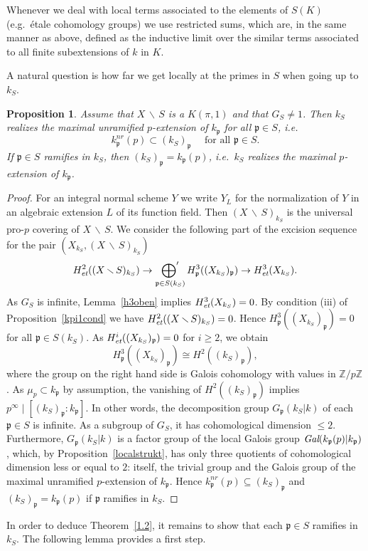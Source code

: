 \documentclass[10pt]{article}
\newcommand{\Z}{{\mathbb Z}}
\newcommand{\p}{{\mathfrak p}}
\newcommand{\sm}{{\,\smallsetminus\,}}
\newcommand{\et}{\text{\it et}}
\newcommand{\Gal}{\text{\it Gal}}
\newcommand{\ressum}{\mathop{\hbox{${\displaystyle\bigoplus}'$}}\limits}
\theoremstyle{alex}
\newtheorem{proposition}[theorem]{Proposition}
\theoremstyle{alexdef}
\begin{document}
\medskip
Whenever we deal with local terms associated to the elements of $S(K)$ (e.g.\ \'{e}tale cohomology groups) we use restricted sums, which are, in the same manner as above, defined as the inductive limit over the similar terms associated to all finite subextensions of $k$ in $K$.


\bigskip
A natural question is how far we get locally at the primes in $S$ when going up to~$k_S$.
\begin{proposition} \label{wieweitlokal}
Assume that $X\sm S$ is a $K(\pi,1)$  and that $G_S\neq 1$. Then $k_S$ realizes the maximal unramified $p$-extension of $k_\p$ for all $\p\in S$, i.e.\
\[
k_\p^{nr}(p) \subset (k_S)_\p \quad \text{ for all } \p\in S.
\]
If\/ $\p \in S$ ramifies in $k_S$, then $(k_S)_\p=k_\p(p)$, i.e.\ $k_S$ realizes the maximal $p$-extension of\/ $k_\p$.
\end{proposition}

\begin{proof} For an integral normal scheme $Y$ we write $Y_L$ for the normalization of $Y$ in an algebraic extension $L$ of its function field.
Then $(X \sm S)_{k_S}$ is the universal pro-$p$ covering of $X\sm S$.
We consider the following part of the excision sequence for the pair $(X_{k_S},  (X \sm S)_{k_S}) $
\[
H^2_\et((X\sm S)_{k_S}) \to \ressum_{\p \in S(k_S)} H^3_\p((X_{k_S})_\p) \to H^3_\et(X_{k_S}) .
\]
As $G_S$ is infinite, Lemma~\ref{h3oben} implies $H^3_\et(X_{k_S})=0$. By condition (iii) of Proposition~\ref{kpi1cond} we have $H^2_\et((X\sm S)_{k_S})=0$.  Hence $H^3_\p((X_{k_S})_\p)=0$ for all $\p \in S(k_S)$.
As $H^i_\et ((X_{k_S})_\p)=0$ for $i\geq 2$, we obtain
\[
H^3_\p((X_{k_S})_\p)\cong H^2((k_S)_\p),
\]
where the group on the right hand side is Galois cohomology with values in $\Z/p\Z$.
As $\mu_p\subset k_\p$ by assumption, the vanishing of $H^2((k_S)_\p)$ implies $p^\infty\mid [(k_S)_\p:k_\p]$. In other words, the decomposition group $G_\p(k_S|k)$ of each $\p\in S$ is infinite. As a subgroup of $G_S$, it has cohomological dimension $\leq 2$. Furthermore, $G_\p(k_S|k)$ is a factor group of the local Galois group $\Gal(k_\p(p)|k_\p)$, which, by Proposition~\ref{localstrukt}, has only three quotients of cohomological dimension less or equal to $2$: itself, the trivial group and the Galois group of the maximal unramified $p$-extension of $k_\p$. Hence $k_\p^{nr}(p) \subseteq (k_S)_\p$ and $(k_S)_\p=k_\p(p)$ if $\p$ ramifies in $k_S$.
\end{proof}



\bigskip
In order to deduce Theorem~\ref{1.2}, it remains to show that each $\p\in S$ ramifies in $k_S$. The following lemma provides a first step.
\end{document}
